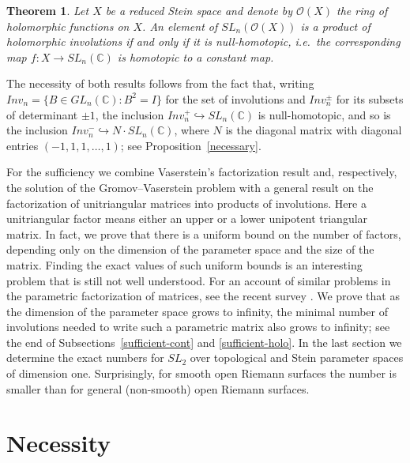 \documentclass{amsart}
\newcommand{\C}{\mathbb{C}}
\newcommand{\holo}{\mathcal{O}}
\newtheorem{Thm}{Theorem}[section]
\theoremstyle{definition}
\begin{document}
\begin{Thm}\label{main-holomorphic} Let $X$ be a reduced Stein  space and denote by $\holo (X)$ the ring of holomorphic  functions on $X$. An element of $SL_n (\holo (X) )$ is a product of holomorphic involutions  if and only if it is null-homotopic, i.e.\ the corresponding  map $f: X \to SL_n (\C)$ is homotopic to a constant map.
    \end{Thm}
    
    The necessity of both results follows from the fact that, writing $Inv_n=\{ B \in GL_n (\C) : B^2 = I \}$ for the set of involutions and $Inv_n^\pm$ for its subsets of determinant $\pm1$, the inclusion $Inv_n^+ \hookrightarrow SL_n(\C)$ is null-homotopic, and so is the inclusion $Inv_n^- \hookrightarrow N \cdot SL_n(\C)$, where $N$ is the diagonal matrix with diagonal entries $(-1,1,1,\ldots,1)$; see Proposition~\ref{necessary}.
    
    For the sufficiency we combine Vaserstein's factorization result and, respectively, the solution of the Gromov--Vaserstein problem with a general result on the factorization of unitriangular matrices into products of involutions. Here a unitriangular factor means either an upper or a lower unipotent triangular matrix. In fact, we prove that there is a uniform bound on the number of factors, depending only on the dimension of the parameter space and the size of the matrix. 
    Finding the exact values of such uniform bounds is an interesting problem that is still not well understood. For an account of similar problems in the parametric factorization of matrices, see the recent survey \cite{MR5024280}. We prove that as the dimension of the parameter space grows to infinity, the minimal number of involutions needed to write such a parametric matrix also grows to infinity; see the end of Subsections~\ref{sufficient-cont} and \ref{sufficient-holo}.
    In the last section we determine the exact numbers for
    $SL_2$ over topological and Stein parameter spaces of dimension one. Surprisingly, for smooth open Riemann surfaces the number is smaller than for general (non-smooth) open Riemann surfaces.

\section{Necessity}
\end{document}
